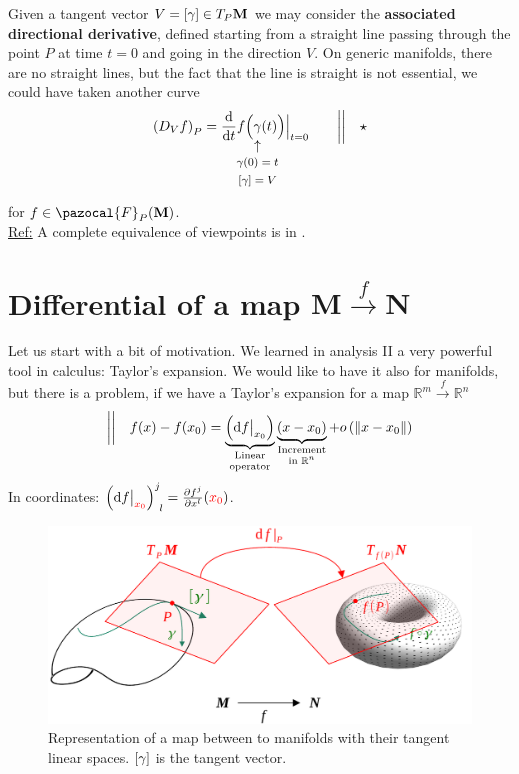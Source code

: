 \documentclass[../main.tex]{subfiles}
\begin{document}
Given a tangent vector $V=\qty[\gamma]\in T_P\mathbf{M}$ we may consider the \textbf{associated directional derivative}, defined starting from a straight line passing through the point $P$ at time $t=0$ and going in the direction $V$. On generic manifolds, there are no straight lines, but the fact that the line is straight is not essential, we could have taken another curve
\[
\left(D_V f\right)_P=\frac{\textrm{d}}{\textrm{d}t}f\Big(\underset{\mathclap{\tikz \node {$\uparrow$} node [below=1ex] {\footnotesize $\gamma(0)=t$} node [below=4ex] {\footnotesize $\qty[\gamma]=V$} ;}}{\gamma}(t)\Big)\Big|_{t=0} \qquad \bigg|\bigg|\quad \star
\]
for $f\in\pazocal{F}_P(\mathbf{M})$.\\
\underline{Ref:} A complete equivalence of viewpoints is in .
\section[Differential of a map]{Differential of a map $\mathbf{M}\xrightarrow{f}\mathbf{N}$}
Let us start with a bit of motivation. We learned in analysis II a very powerful tool in calculus: Taylor's expansion. We would like to have it also for manifolds, but there is a problem, if we have a Taylor's expansion for a map $\mathbb{R}^m\xrightarrow{f}\mathbb{R}^n$
\[
\bigg|\bigg|\quad f(x)-f(x_0)=\underbrace{\left(\textrm{d}f\big|_{x_0}\right)}_{\mathclap{\text{\parbox{4 cm}{\centering Linear \\[-4pt]  operator}}}}\underbrace{\left(x-x_0\right)}_{\mathclap{\text{\parbox{4 cm}{\centering Increment \\[-4pt] in $\mathbb{R}^n$}}}}+o \left(\norm{x-x_0}\right)
\]
In coordinates: \(\left(\textrm{d}f\big|_{\color{red}x_0}\right)^j_{\ l}=\frac{\partial f^j}{\partial x^l}({\color{red} x_0})\).
\begin{figure}[H]
	\includegraphics{images/differential_of_a_map.pdf}
	\caption[Differential of a map]{Representation of a map between to manifolds with their tangent linear spaces. $\qty[\gamma]$ is the tangent vector.}
\end{figure}
\end{document}
